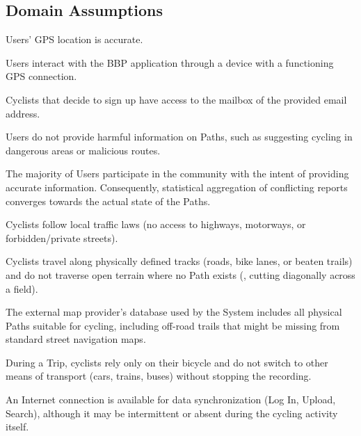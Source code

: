 \subsection{Domain Assumptions}
\label{domain_assumptions}
\begin{dalist}
    \item Users' GPS location is accurate.
    \item Users interact with the BBP application through a device with a functioning GPS connection. 
    \item Cyclists that decide to sign up have access to the mailbox of the provided email address.
    \item Users do not provide harmful information on Paths, such as suggesting cycling in dangerous areas or malicious routes.
    \item The majority of Users participate in the community with the intent of providing accurate information. Consequently, statistical aggregation of conflicting reports converges towards the actual state of the Paths.    
    \item Cyclists follow local traffic laws (\eg no access to highways, motorways, or forbidden/private streets).    
    \item Cyclists travel along physically defined tracks (roads, bike lanes, or beaten trails) and do not traverse open terrain where no Path exists (\eg, cutting diagonally across a field).
    \item The external map provider's database used by the System includes all physical Paths suitable for cycling, including off-road trails that might be missing from standard street navigation maps.
    \item During a Trip, cyclists rely only on their bicycle and do not switch to other means of transport (\eg cars, trains, buses) without stopping the recording.
    \item An Internet connection is available for data synchronization (Log In, Upload, Search), although it may be intermittent or absent during the cycling activity itself.
\end{dalist}